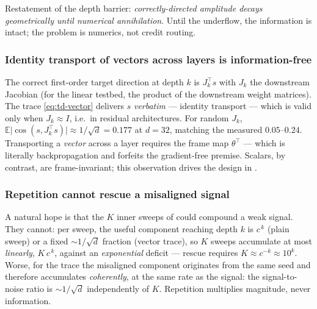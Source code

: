 \documentclass{article}
\let\cref\crtcref
\begin{document}
\vspace{0.5em}
\begin{tcolorbox}
Restatement of the depth barrier: \emph{correctly-directed amplitude decays
geometrically until numerical annihilation}. Until the underflow, the information is
intact; the problem is numerics, not credit routing.
\end{tcolorbox}
\vspace{0.5em}

\subsubsection{Identity transport of vectors across layers is information-free}
The correct first-order target direction at depth $k$ is $J_k^\top s$ with $J_k$ the
downstream Jacobian (for the linear testbed, the product of the downstream weight
matrices). The trace \eqref{eq:td-vector} delivers $s$ \emph{verbatim} --- identity
transport --- which is valid only when $J_k \approx I$, i.e.\ in residual
architectures. For random $J_k$,
$\mathbb{E}\lvert\cos(s, J_k^\top s)\rvert \approx 1/\sqrt{d} = 0.177$ at $d=32$,
matching the measured $0.05$--$0.24$. Transporting a \emph{vector} across a layer
requires the frame map $\theta^\top$ --- which is literally backpropagation and
forfeits the gradient-free premise. Scalars, by contrast, are frame-invariant; this
observation drives the design in \cref{sec:td-pipe}.

\subsubsection{Repetition cannot rescue a misaligned signal}
A natural hope is that the $K$ inner sweeps of \cref{alg:minibatch} could compound a
weak signal. They cannot: per sweep, the useful component reaching depth $k$ is
$c^{\,k}$ (plain sweep) or a fixed $\sim\!1/\sqrt{d}$ fraction (vector trace), so $K$
sweeps accumulate at most \emph{linearly}, $K\,c^{\,k}$, against an
\emph{exponential} deficit --- rescue requires $K \approx c^{-k} \approx 10^{k}$.
Worse, for the trace the misaligned component originates from the same seed and
therefore accumulates \emph{coherently}, at the same rate as the signal: the
signal-to-noise ratio is $\sim\!1/\sqrt d$ independently of $K$. Repetition
multiplies magnitude, never information.
\end{document}
